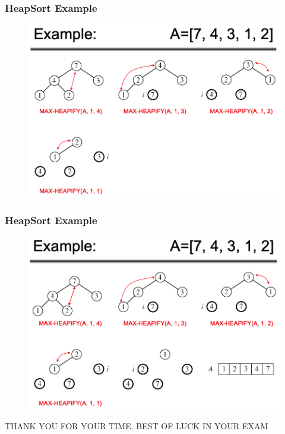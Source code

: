 \documentclass[11pt]{beamer}
\begin{document}
\begin{frame}
	\frametitle	{HeapSort Example} 
	\begin{figure}
		\centering
		\includegraphics[width=1\linewidth]{"Screenshot 2020-12-23 at 9.42.34 PM"}
		\label{fig:screenshot-2020-12-23-at-9}
	\end{figure}
	
\end{frame}
\begin{frame}
	\frametitle	{HeapSort Example} 
	\begin{figure}
		\centering
		\includegraphics[width=1\linewidth]{"Screenshot 2020-12-23 at 9.42.43 PM"}
		\label{fig:screenshot-2020-12-23-at-9}
	\end{figure}
\end{frame}

\begin{frame}
	\alert{THANK YOU FOR YOUR TIME. BEST OF LUCK IN YOUR EXAM}
\end{frame}
\end{document}

